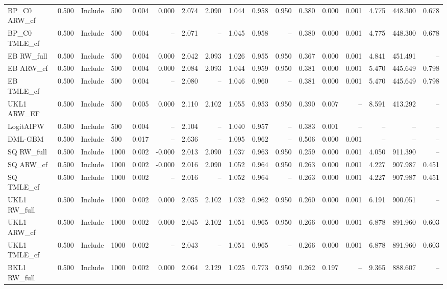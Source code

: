 \begin{tabular}{llllrrrrrrrrrrrrr}
BP\_C0 ARW\_cf & 0.500 & Include & 500 & 0.004 & 0.000 & 2.074 & 2.090 & 1.044 & 0.958 & 0.950 & 0.380 & 0.000 & 0.001 & 4.775 & 448.300 & 0.678 \\
BP\_C0 TMLE\_cf & 0.500 & Include & 500 & 0.004 & -- & 2.071 & -- & 1.045 & 0.958 & -- & 0.380 & 0.000 & 0.001 & 4.775 & 448.300 & 0.678 \\
EB RW\_full & 0.500 & Include & 500 & 0.004 & 0.000 & 2.042 & 2.093 & 1.026 & 0.955 & 0.950 & 0.367 & 0.000 & 0.001 & 4.841 & 451.491 & -- \\
EB ARW\_cf & 0.500 & Include & 500 & 0.004 & 0.000 & 2.084 & 2.093 & 1.044 & 0.959 & 0.950 & 0.381 & 0.000 & 0.001 & 5.470 & 445.649 & 0.798 \\
EB TMLE\_cf & 0.500 & Include & 500 & 0.004 & -- & 2.080 & -- & 1.046 & 0.960 & -- & 0.381 & 0.000 & 0.001 & 5.470 & 445.649 & 0.798 \\
UKL1 ARW\_EF & 0.500 & Include & 500 & 0.005 & 0.000 & 2.110 & 2.102 & 1.055 & 0.953 & 0.950 & 0.390 & 0.007 & -- & 8.591 & 413.292 & -- \\
LogitAIPW & 0.500 & Include & 500 & 0.004 & -- & 2.104 & -- & 1.040 & 0.957 & -- & 0.383 & 0.001 & -- & -- & -- & -- \\
DML-GBM & 0.500 & Include & 500 & 0.017 & -- & 2.636 & -- & 1.095 & 0.962 & -- & 0.506 & 0.000 & 0.001 & -- & -- & -- \\
SQ RW\_full & 0.500 & Include & 1000 & 0.002 & -0.000 & 2.013 & 2.090 & 1.037 & 0.963 & 0.950 & 0.259 & 0.000 & 0.001 & 4.050 & 911.390 & -- \\
SQ ARW\_cf & 0.500 & Include & 1000 & 0.002 & -0.000 & 2.016 & 2.090 & 1.052 & 0.964 & 0.950 & 0.263 & 0.000 & 0.001 & 4.227 & 907.987 & 0.451 \\
SQ TMLE\_cf & 0.500 & Include & 1000 & 0.002 & -- & 2.016 & -- & 1.052 & 0.964 & -- & 0.263 & 0.000 & 0.001 & 4.227 & 907.987 & 0.451 \\
UKL1 RW\_full & 0.500 & Include & 1000 & 0.002 & 0.000 & 2.035 & 2.102 & 1.032 & 0.962 & 0.950 & 0.260 & 0.000 & 0.001 & 6.191 & 900.051 & -- \\
UKL1 ARW\_cf & 0.500 & Include & 1000 & 0.002 & 0.000 & 2.045 & 2.102 & 1.051 & 0.965 & 0.950 & 0.266 & 0.000 & 0.001 & 6.878 & 891.960 & 0.603 \\
UKL1 TMLE\_cf & 0.500 & Include & 1000 & 0.002 & -- & 2.043 & -- & 1.051 & 0.965 & -- & 0.266 & 0.000 & 0.001 & 6.878 & 891.960 & 0.603 \\
BKL1 RW\_full & 0.500 & Include & 1000 & 0.002 & 0.000 & 2.064 & 2.129 & 1.025 & 0.773 & 0.950 & 0.262 & 0.197 & -- & 9.365 & 888.607 & -- \\

\end{tabular}
